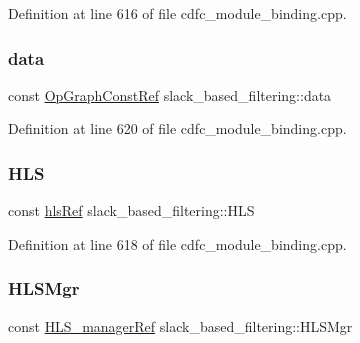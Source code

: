 Definition at line 616 of file cdfc\+\_\+module\+\_\+binding.\+cpp.

\mbox{\label{structslack__based__filtering_ae3b2e6a3f1f6f3be05d13dc8e77b10aa}} 
\subsubsection{\texorpdfstring{data}{data}}
{\footnotesize\ttfamily const \hyperlink{op__graph_8hpp_a9a0b240622c47584bee6951a6f5de746}{Op\+Graph\+Const\+Ref} slack\+\_\+based\+\_\+filtering\+::data\hspace{0.3cm}{\ttfamily [private]}}



Definition at line 620 of file cdfc\+\_\+module\+\_\+binding.\+cpp.

\mbox{\label{structslack__based__filtering_a92eabd1759031db4dbd9779f37d2d32c}} 
\subsubsection{\texorpdfstring{H\+LS}{HLS}}
{\footnotesize\ttfamily const \hyperlink{hls_8hpp_a75d0c73923d0ddfa28c4843a802c73a7}{hls\+Ref} slack\+\_\+based\+\_\+filtering\+::\+H\+LS\hspace{0.3cm}{\ttfamily [private]}}



Definition at line 618 of file cdfc\+\_\+module\+\_\+binding.\+cpp.

\mbox{\label{structslack__based__filtering_ac359b1f6447cbc87373325f09fbaa553}} 
\subsubsection{\texorpdfstring{H\+L\+S\+Mgr}{HLSMgr}}
{\footnotesize\ttfamily const \hyperlink{hls__manager_8hpp_acd3842b8589fe52c08fc0b2fcc813bfe}{H\+L\+S\+\_\+manager\+Ref} slack\+\_\+based\+\_\+filtering\+::\+H\+L\+S\+Mgr\hspace{0.3cm}{\ttfamily [private]}}



